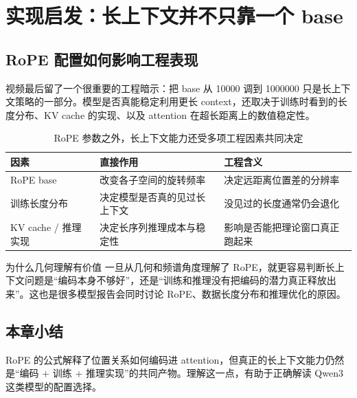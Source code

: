 \section{实现启发：长上下文并不只靠一个 base}
\subsection{RoPE 配置如何影响工程表现}
视频最后留了一个很重要的工程暗示：把 base 从 10000 调到 1000000 只是长上下文策略的一部分。模型是否真能稳定利用更长 context，还取决于训练时看到的长度分布、KV cache 的实现、以及 attention 在超长距离上的数值稳定性。

\begin{table}[H]
\centering
\begin{tabular}{p{3.2cm}p{4.6cm}p{4.6cm}}
\toprule
因素 & 直接作用 & 工程含义 \\
\midrule
RoPE base & 改变各子空间的旋转频率 & 决定远距离位置差的分辨率 \\
训练长度分布 & 决定模型是否真的见过长上下文 & 没见过的长度通常仍会退化 \\
KV cache / 推理实现 & 决定长序列推理成本与稳定性 & 影响是否能把理论窗口真正跑起来 \\
\bottomrule
\end{tabular}
\caption{RoPE 参数之外，长上下文能力还受多项工程因素共同决定}
\end{table}

\begin{knowledgebox}{为什么几何理解有价值}
一旦从几何和频谱角度理解了 RoPE，就更容易判断长上下文问题是“编码本身不够好”，还是“训练和推理没有把编码的潜力真正释放出来”。这也是很多模型报告会同时讨论 RoPE、数据长度分布和推理优化的原因。
\end{knowledgebox}

\subsection{本章小结}
RoPE 的公式解释了位置关系如何编码进 attention，但真正的长上下文能力仍然是“编码 + 训练 + 推理实现”的共同产物。理解这一点，有助于正确解读 Qwen3 这类模型的配置选择。

